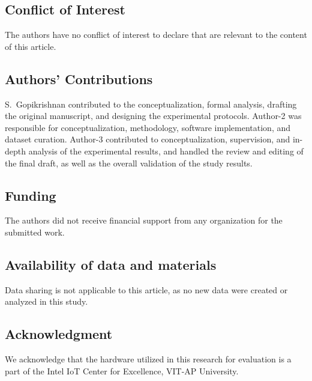 \documentclass[a4paper,fleqn]{cas-dc}
\numberwithin{equation}{section}
\begin{document}
\subsection{Conflict of Interest}
The authors have no conflict of interest to declare that are relevant to the content of this article.

\subsection{Authors' Contributions}
S.~Gopikrishnan contributed to the conceptualization, formal analysis, drafting the original manuscript, and designing the experimental protocols. Author-2 was responsible for conceptualization, methodology, software implementation, and dataset curation. Author-3 contributed to conceptualization, supervision, and in-depth analysis of the experimental results, and handled the review and editing of the final draft, as well as the overall validation of the study results.

\subsection{Funding}
The authors did not receive financial support from any organization for the submitted work.

\subsection{Availability of data and materials}
Data sharing is not applicable to this article, as no new data were created or analyzed in this study.

\subsection{Acknowledgment}
We acknowledge that the hardware utilized in this research for evaluation is a part of the Intel IoT Center for Excellence, VIT-AP University.



\end{document}
